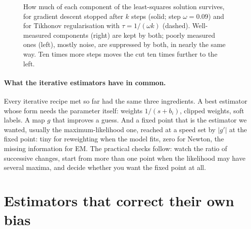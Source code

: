 \begin{figure}[htbp]
\centering
{}
\caption{How much of each component of the least-squares solution
survives, for gradient descent stopped after $k$ steps (solid; step
$\omega=0.09$) and for Tikhonov regularisation with $\tau=1/(\omega k)$ (dashed).
Well-measured components (right) are kept by both; poorly measured ones
(left), mostly noise, are suppressed by both, in nearly the same way. Ten
times more steps moves the cut ten times further to the left.}
\label{T5b:fig:filters}
\end{figure}

\paragraph{What the iterative estimators have in common.}
Every iterative recipe met so far had the same three ingredients. A best estimator
whose form needs the parameter itself: weights $1/(s+b_i)$, clipped weights,
soft labels. A map $g$ that improves a guess. And a fixed point that is the
estimator we wanted, usually the maximum-likelihood one, reached at a speed
set by $|g'|$ at the fixed point: tiny for reweighting when the model fits,
zero for Newton, the missing information for EM. The practical checks follow:
watch the ratio of successive changes, start from more than one point when
the likelihood may have several maxima, and decide whether you want the
fixed point at all.
\section{Estimators that correct their own bias}
\label{T5b:sec:bias}

